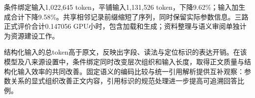 \begin{table}[htbp]
\centering\small
\caption{证据表示的token及GPU任务成本}
\label{tab:coverage-cost}
\CoverageCostTable
\end{table}

条件绑定输入1,022,645 token，平铺输入1,131,526 token，下降9.62\%；输入加生成合计下降9.58\%。共享相邻记录前缀缩短了序列，同时保留实际参数信息。三路正式评价合计0.147056 GPU小时，包含加载和生成；资料整理与语义审阅单独计为资源建设工作。

结构化输入的总token高于原文，反映出字段、读法与定位标识的表达开销。在该模型及八来源设置中，条件绑定同时改变层次组织和输入长度，取得正文质量与结构化输入效率的共同改善。固定语义的编码比较与统一引用解析提供互补观察：参数关系的显式组织改善正文内容，引用标识的规范处理进一步提高可追溯回答比例。
